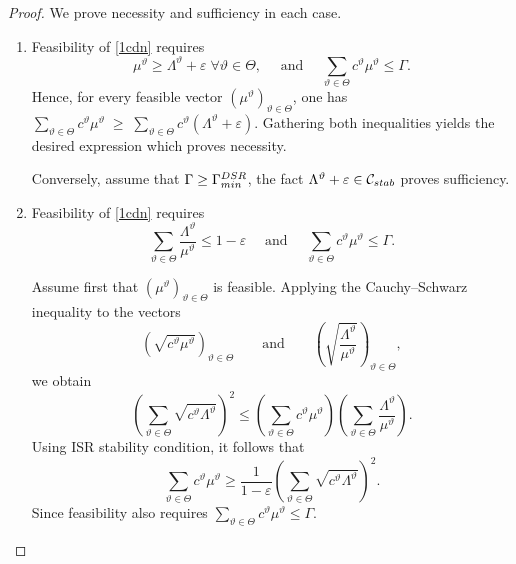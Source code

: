 \documentclass[10pt,a4paper]{amsart}
\begin{document}
\begin{proof}
We prove necessity and sufficiency in each case.

\medskip

\begin{enumerate}[label=\roman*), ref=\roman*]
    \item Feasibility of \eqref{1cdn} requires 
    $$
\mu^\vartheta \ge \Lambda^\vartheta+\varepsilon
\; \forall \vartheta\in\Theta, \quad \text{ and }\quad
\sum_{\vartheta\in\Theta} c^\vartheta \mu^\vartheta \le \Gamma.
$$
Hence, for every feasible vector $(\mu^\vartheta)_{\vartheta\in\Theta}$, one has  $\sum_{\vartheta\in\Theta} c^\vartheta \mu^\vartheta
\;\ge\;
\sum_{\vartheta\in\Theta} c^\vartheta(\Lambda^\vartheta+\varepsilon)$. Gathering both inequalities yields the desired expression which proves necessity.

Conversely, assume that $\Gamma \ge \Gamma_{\rm min}^{\rm DSR}$, the fact $\Lambda^\vartheta+\varepsilon\in \mathcal{C}_{\rm stab}$ proves sufficiency.

\item 
Feasibility of \eqref{1cdn} requires
$$
\sum_{\vartheta\in\Theta}\frac{\Lambda^\vartheta}{\mu^\vartheta}\le 1-\varepsilon \quad \text{ and }\quad \sum_{\vartheta\in\Theta} c^\vartheta \mu^\vartheta \le \Gamma.
$$

Assume first that $(\mu^\vartheta)_{\vartheta\in\Theta}$ is feasible. Applying the Cauchy--Schwarz inequality to the vectors
$$
\left(\sqrt{c^\vartheta\mu^\vartheta}\right)_{\vartheta\in\Theta}
\qquad\text{and}\qquad
\left(\sqrt{\frac{\Lambda^\vartheta}{\mu^\vartheta}}\right)_{\vartheta\in\Theta},
$$
we obtain
$$
\left(\sum_{\vartheta\in\Theta}\sqrt{c^\vartheta\Lambda^\vartheta}\right)^2
\le
\left(\sum_{\vartheta\in\Theta} c^\vartheta\mu^\vartheta\right)
\left(\sum_{\vartheta\in\Theta}\frac{\Lambda^\vartheta}{\mu^\vartheta}\right).
$$
Using ISR stability condition, it follows that
$$
\sum_{\vartheta\in\Theta} c^\vartheta\mu^\vartheta
\ge
\frac{1}{1-\varepsilon}
\left(\sum_{\vartheta\in\Theta}\sqrt{c^\vartheta\Lambda^\vartheta}\right)^2.
$$
Since feasibility also requires $\sum_{\vartheta\in\Theta} c^\vartheta\mu^\vartheta\le\Gamma$.


\end{enumerate}
\end{proof}
\end{document}
